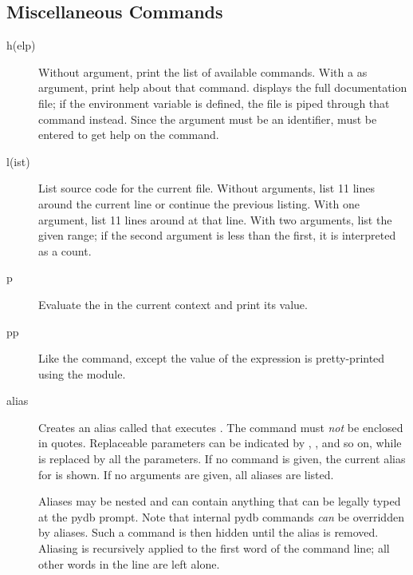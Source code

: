 \subsection{Miscellaneous Commands}
\begin{description}

\item[h(elp) ]

Without argument, print the list of available commands.  With a
 as argument, print help about that command.   displays the full documentation file; if the environment variable
 is defined, the file is piped through that command
instead.  Since the  argument must be an identifier,
 must be entered to get help on the \samp{!} command.

\item[l(ist) ]

List source code for the current file.  Without arguments, list 11
lines around the current line or continue the previous listing.  With
one argument, list 11 lines around at that line.  With two arguments,
list the given range; if the second argument is less than the first,
it is interpreted as a count.

\item[p ]

Evaluate the  in the current context and print its
value.  

\item[pp ]

Like the  command, except the value of the expression is
pretty-printed using the  module.

\item[alias ]

Creates an alias called  that executes .  The
command must \emph{not} be enclosed in quotes.  Replaceable parameters
can be indicated by , , and so on, while \samp{\%*} is
replaced by all the parameters.  If no command is given, the current
alias for  is shown. If no arguments are given, all
aliases are listed.

Aliases may be nested and can contain anything that can be
legally typed at the pydb prompt.  Note that internal pydb commands
\emph{can} be overridden by aliases.  Such a command is
then hidden until the alias is removed.  Aliasing is recursively
applied to the first word of the command line; all other words
in the line are left alone.


\end{description}
